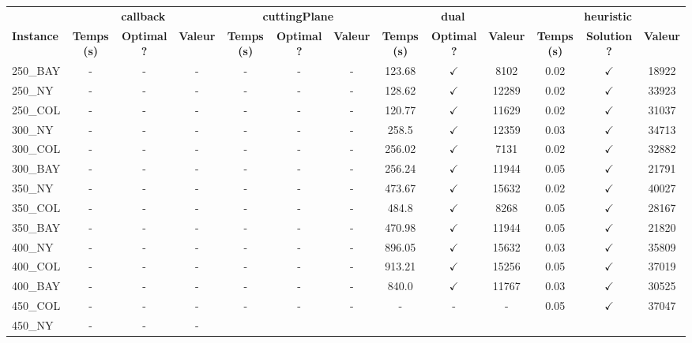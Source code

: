 \documentclass[main.tex]{subfiles}
\begin{document}
\newpage
\begin{landscape}
\begin{center}
\renewcommand{\arraystretch}{1.4} 
 \begin{tabular}{lcccccccccccc}
	\hline
 & \multicolumn{3}{c}{\textbf{callback}} & \multicolumn{3}{c}{\textbf{cuttingPlane}} & \multicolumn{3}{c}{\textbf{dual}} & \multicolumn{3}{c}{\textbf{heuristic}}\\
\textbf{Instance}  & \textbf{Temps (s)} & \textbf{Optimal ?} & \textbf{Valeur} & \textbf{Temps (s)} & \textbf{Optimal ?} & \textbf{Valeur} & \textbf{Temps (s)} & \textbf{Optimal ?} & \textbf{Valeur} & \textbf{Temps (s)} & \textbf{Solution ?} & \textbf{Valeur}\\\hline

250\_BAY & - & - & - 
 & - & - & - 
 & 123.68 & $\checkmark$ & 8102 & 0.02 & $\checkmark$ & 18922\\
250\_NY & - & - & - 
 & - & - & - 
 & 128.62 & $\checkmark$ & 12289 & 0.02 & $\checkmark$ & 33923\\
250\_COL & - & - & - 
 & - & - & - 
 & 120.77 & $\checkmark$ & 11629 & 0.02 & $\checkmark$ & 31037\\
300\_NY & - & - & - 
 & - & - & - 
 & 258.5 & $\checkmark$ & 12359 & 0.03 & $\checkmark$ & 34713\\
300\_COL & - & - & - 
 & - & - & - 
 & 256.02 & $\checkmark$ & 7131 & 0.02 & $\checkmark$ & 32882\\
300\_BAY & - & - & - 
 & - & - & - 
 & 256.24 & $\checkmark$ & 11944 & 0.05 & $\checkmark$ & 21791\\
350\_NY & - & - & - 
 & - & - & - 
 & 473.67 & $\checkmark$ & 15632 & 0.02 & $\checkmark$ & 40027\\
350\_COL & - & - & - 
 & - & - & - 
 & 484.8 & $\checkmark$ & 8268 & 0.05 & $\checkmark$ & 28167\\
350\_BAY & - & - & - 
 & - & - & - 
 & 470.98 & $\checkmark$ & 11944 & 0.05 & $\checkmark$ & 21820\\
400\_NY & - & - & - 
 & - & - & - 
 & 896.05 & $\checkmark$ & 15632 & 0.03 & $\checkmark$ & 35809\\
400\_COL & - & - & - 
 & - & - & - 
 & 913.21 & $\checkmark$ & 15256 & 0.05 & $\checkmark$ & 37019\\
400\_BAY & - & - & - 
 & - & - & - 
 & 840.0 & $\checkmark$ & 11767 & 0.03 & $\checkmark$ & 30525\\
450\_COL & - & - & - 
 & - & - & - 
 & - & - & - 
 & 0.05 & $\checkmark$ & 37047\\
450\_NY & - & - & - 

\end{tabular}
\end{center}
\end{landscape}
\end{document}
